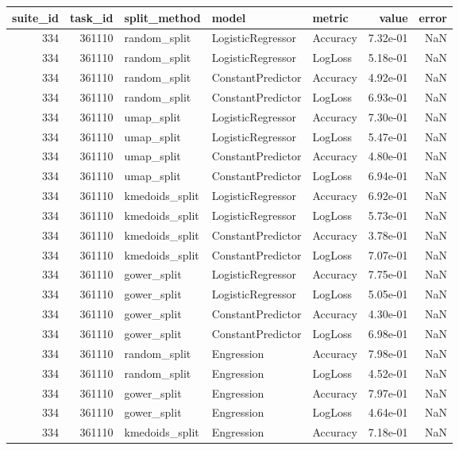 \begin{tabular}{rrlllrr}
\toprule
suite\_id & task\_id & split\_method & model & metric & value & error \\
\midrule
334 & 361110 & random\_split & LogisticRegressor & Accuracy & 7.32e-01 & NaN \\
334 & 361110 & random\_split & LogisticRegressor & LogLoss & 5.18e-01 & NaN \\
334 & 361110 & random\_split & ConstantPredictor & Accuracy & 4.92e-01 & NaN \\
334 & 361110 & random\_split & ConstantPredictor & LogLoss & 6.93e-01 & NaN \\
334 & 361110 & umap\_split & LogisticRegressor & Accuracy & 7.30e-01 & NaN \\
334 & 361110 & umap\_split & LogisticRegressor & LogLoss & 5.47e-01 & NaN \\
334 & 361110 & umap\_split & ConstantPredictor & Accuracy & 4.80e-01 & NaN \\
334 & 361110 & umap\_split & ConstantPredictor & LogLoss & 6.94e-01 & NaN \\
334 & 361110 & kmedoids\_split & LogisticRegressor & Accuracy & 6.92e-01 & NaN \\
334 & 361110 & kmedoids\_split & LogisticRegressor & LogLoss & 5.73e-01 & NaN \\
334 & 361110 & kmedoids\_split & ConstantPredictor & Accuracy & 3.78e-01 & NaN \\
334 & 361110 & kmedoids\_split & ConstantPredictor & LogLoss & 7.07e-01 & NaN \\
334 & 361110 & gower\_split & LogisticRegressor & Accuracy & 7.75e-01 & NaN \\
334 & 361110 & gower\_split & LogisticRegressor & LogLoss & 5.05e-01 & NaN \\
334 & 361110 & gower\_split & ConstantPredictor & Accuracy & 4.30e-01 & NaN \\
334 & 361110 & gower\_split & ConstantPredictor & LogLoss & 6.98e-01 & NaN \\
334 & 361110 & random\_split & Engression & Accuracy & 7.98e-01 & NaN \\
334 & 361110 & random\_split & Engression & LogLoss & 4.52e-01 & NaN \\
334 & 361110 & gower\_split & Engression & Accuracy & 7.97e-01 & NaN \\
334 & 361110 & gower\_split & Engression & LogLoss & 4.64e-01 & NaN \\
334 & 361110 & kmedoids\_split & Engression & Accuracy & 7.18e-01 & NaN \\

\end{tabular}
